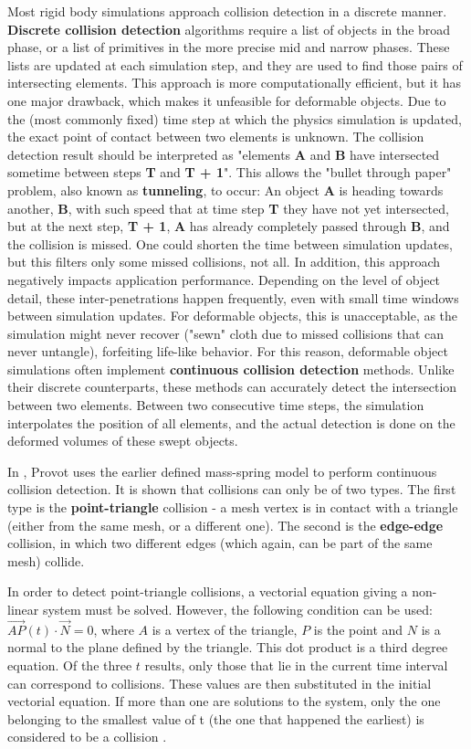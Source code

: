Most rigid body simulations approach collision detection in a discrete manner. \textbf{Discrete collision detection} algorithms require a list of objects in the broad phase, or a list of primitives in the more precise mid and narrow phases. These lists are updated at each simulation step, and they are used to find those pairs of intersecting elements. This approach is more computationally efficient, but it has one major drawback, which makes it unfeasible for deformable objects. Due to the (most commonly fixed) time step at which the physics simulation is updated, the exact point of contact between two elements is unknown. The collision detection result should be interpreted as "elements \textbf{A} and \textbf{B} have intersected sometime between steps \textbf{T} and \textbf{T + 1}". This allows the "bullet through paper" problem, also known as \textbf{tunneling}, to occur: An object \textbf{A} is heading towards another, \textbf{B}, with such speed that at time step \textbf{T} they have not yet intersected, but at the next step, \textbf{T + 1}, \textbf{A} has already completely passed through \textbf{B}, and the collision is missed. One could shorten the time between simulation updates, but this filters only some missed collisions, not all. In addition, this approach negatively impacts application performance. Depending on the level of object detail, these inter-penetrations happen frequently, even with small time windows between simulation updates. For deformable objects, this is unacceptable, as the simulation might never recover ("sewn" cloth due to missed collisions that can never untangle), forfeiting life-like behavior. For this reason, deformable object simulations often implement \textbf{continuous collision detection} methods. Unlike their discrete counterparts, these methods can accurately detect the intersection between two elements. Between two consecutive time steps, the simulation interpolates the position of all elements, and the actual detection is done on the deformed volumes of these swept objects.

In \cite{provot97}, Provot uses the earlier defined mass-spring model \cite{provot95} to perform continuous collision detection. It is shown that collisions can only be of two types. The first type is the \textbf{point-triangle} collision - a mesh vertex is in contact with a triangle (either from the same mesh, or a different one). The second is the \textbf{edge-edge} collision, in which two different edges (which again, can be part of the same mesh) collide.

In order to detect point-triangle collisions, a vectorial equation giving a non-linear system must be solved. However, the following condition can be used: $\overrightarrow{AP}(t) \cdot \overrightarrow{N} = 0$, where $A$ is a vertex of the triangle, $P$ is the point and $N$ is a normal to the plane defined by the triangle. This dot product is a third degree equation. Of the three $t$ results, only those that lie in the current time interval can correspond to collisions. These values are then substituted in the initial vectorial equation. If more than one are solutions to the system, only the one belonging to the smallest value of t (the one that happened the earliest) is considered to be a collision \cite{provot97}.

